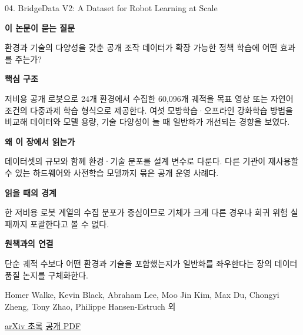 \documentclass[11pt,openany]{book}
\begin{document}
\begin{termcard}{04. BridgeData V2: A Dataset for Robot Learning at Scale}

\par

\medskip

{\sffamily\bfseries\color{deepblue} 이 논문이 묻는 질문}\par

환경과 기술의 다양성을 갖춘 공개 조작 데이터가 확장 가능한 정책 학습에 어떤 효과를 주는가?

\smallskip

{\sffamily\bfseries\color{deepblue} 핵심 구조}\par

저비용 공개 로봇으로 24개 환경에서 수집한 60,096개 궤적을 목표 영상 또는 자연어 조건의 다중과제 학습 형식으로 제공한다. 여섯 모방학습·오프라인 강화학습 방법을 비교해 데이터와 모델 용량, 기술 다양성이 늘 때 일반화가 개선되는 경향을 보였다.

\smallskip

{\sffamily\bfseries\color{deepblue} 왜 이 장에서 읽는가}\par

데이터셋의 규모와 함께 환경·기술 분포를 설계 변수로 다룬다. 다른 기관이 재사용할 수 있는 하드웨어와 사전학습 모델까지 묶은 공개 운영 사례다.

\smallskip

{\sffamily\bfseries\color{coral} 읽을 때의 경계}\par

한 저비용 로봇 계열의 수집 분포가 중심이므로 기체가 크게 다른 경우나 희귀 위험 실패까지 포괄한다고 볼 수 없다.

\smallskip

{\sffamily\bfseries\color{teal} 원책과의 연결}\par

단순 궤적 수보다 어떤 환경과 기술을 포함했는지가 일반화를 좌우한다는 장의 데이터 품질 논지를 구체화한다.

\medskip

{\footnotesize\color{muted} Homer Walke, Kevin Black, Abraham Lee, Moo Jin Kim, Max Du, Chongyi Zheng, Tony Zhao, Philippe Hansen-Estruch 외\par

\href{https://arxiv.org/abs/2308.12952}{arXiv 초록} \quad \href{https://arxiv.org/pdf/2308.12952}{공개 PDF}\par}

\end{termcard}
\end{document}
